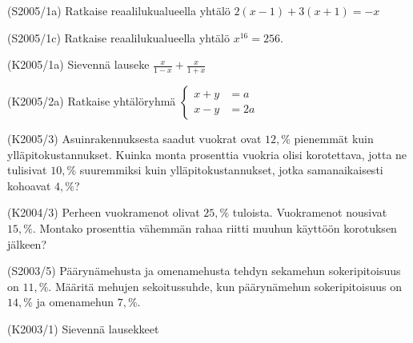 \begin{tehtava}(S2005/1a)  Ratkaise reaalilukualueella yhtälö 
                       $ 2(x - 1) + 3(x + 1 ) = -x $
\end{tehtava}

\begin{tehtava}(S2005/1c)  Ratkaise reaalilukualueella yhtälö $ x^{16} = 256 $.
\end{tehtava}

\begin{tehtava}(K2005/1a)  Sievennä lauseke
                        $ \frac{x}{1 - x} + \frac{x}{1 + x} $
\end{tehtava}

\begin{tehtava}(K2005/2a)  Ratkaise yhtälöryhmä
                      $
                        \left\{
                        \begin{aligned}
                             x + y &= a \\
                             x - y &= 2a
                        \end{aligned}
                        \right.
                    $
\end{tehtava}

\begin{tehtava}(K2005/3)   Asuinrakennuksesta saadut vuokrat ovat $12,\%$ pienemmät kuin
                        ylläpitokustannukset. Kuinka monta prosenttia vuokria olisi
                        korotettava, jotta ne tulisivat $10,\%$ suuremmiksi kuin 
                        ylläpitokustannukset, jotka samanaikaisesti kohoavat $4,\%$?
\end{tehtava}

\begin{tehtava}(K2004/3)   Perheen vuokramenot olivat $25,\%$ tuloista. Vuokramenot nousivat
                        $15,\%$. Montako prosenttia vähemmän rahaa riitti muuhun
                        käyttöön korotuksen jälkeen?
\end{tehtava}

\begin{tehtava}(S2003/5)   Päärynämehusta ja omenamehusta tehdyn sekamehun sokeripitoisuus
                        on $11,\%$. Määritä mehujen sekoitussuhde, kun päärynämehun
                        sokeripitoisuus on $14,\%$ ja omenamehun $7,\%$.
\end{tehtava}


\begin{tehtava}(K2003/1)   Sievennä lausekkeet
        \begin{alakohdat}
        \end{alakohdat}
\end{tehtava}

